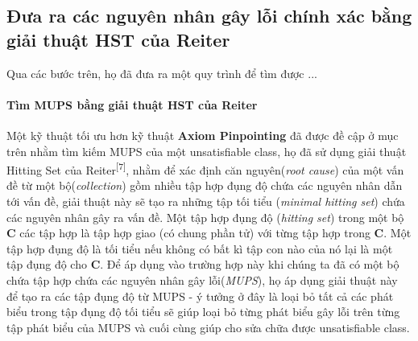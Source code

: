 \subsection{Đưa ra các nguyên nhân gây lỗi chính xác bằng giải thuật HST của Reiter}
Qua các bước trên, họ đã đưa ra một quy trình để tìm được ...

\paragraph{Tìm MUPS bằng giải thuật HST của Reiter}
Một kỹ thuật tối ưu hơn kỹ thuật \textbf{Axiom Pinpointing} đã được đề cập ở mục trên nhằm tìm kiếm MUPS của một unsatisfiable class, họ đã sử dụng giải thuật Hitting Set của Reiter\textsuperscript{[7]}, nhằm để xác định căn nguyên(\textit{root cause}) của một vấn đề từ một bộ(\textit{collection}) gồm nhiều tập hợp đụng độ chứa các nguyên nhân dẫn tới vấn đề, giải thuật này sẽ tạo ra những tập tối tiểu (\textit{minimal hitting set}) chứa các nguyên nhân gây ra vấn đề. Một tập hợp đụng độ (\textit{hitting set}) trong một bộ \textbf{C} các tập hợp là tập hợp giao (có chung phần tử) với từng tập hợp trong \textbf{C}. Một tập hợp đụng độ là tối tiểu nếu không có bất kì tập con nào của nó lại là một tập đụng độ cho \textbf{C}. Để áp dụng vào trường hợp này khi chúng ta đã có một bộ chứa tập hợp chứa các nguyên nhân gây lỗi(\textit{MUPS}), họ áp dụng giải thuật này để tạo ra các tập đụng độ từ MUPS - ý tưởng ở đây là loại bỏ tất cả các phát biểu trong tập đụng độ tối tiểu sẽ giúp loại bỏ từng phát biểu gây lỗi trên từng tập phát biểu của MUPS và cuối cùng giúp cho sửa chữa được unsatisfiable class.		
